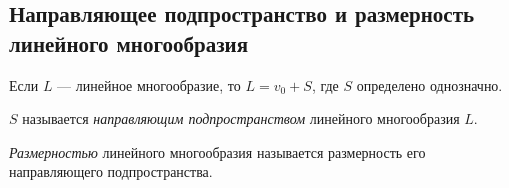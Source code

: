 \subsection{Направляющее подпространство и размерность линейного многообразия}
 
Если $L$ --- линейное многообразие, то $L = v_0 + S$, где $S$ определено однозначно.

\begin{definition}
    $S$ называется \textit{направляющим подпространством} линейного многообразия $L$.
\end{definition}

\begin{definition}
    \textit{Размерностью} линейного многообразия называется размерность его направляющего подпространства.
\end{definition}

